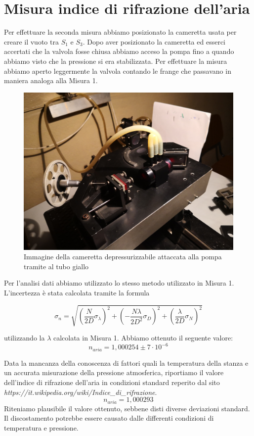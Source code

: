 \documentclass{article}
\begin{document}
\pagebreak
\section{Misura indice di rifrazione dell'aria}
Per effettuare la seconda misura abbiamo posizionato la cameretta usata per creare il vuoto tra $S_1$ e $S_3$. Dopo aver posizionato la cameretta ed esserci accertati che la valvola fosse chiusa abbiamo acceso la pompa fino a quando abbiamo visto che la pressione si era stabilizzata. Per effettuare la misura abbiamo aperto leggermente la valvola contando le frange che passavano in maniera analoga alla Misura 1.

\begin{figure}[h!]
  \centering
  \includegraphics[width=0.6\linewidth]{IM cameretta}
  \caption{Immagine della cameretta depressurizzabile attaccata alla pompa tramite al tubo giallo}
\end{figure}

\pagebreak
Per l'analisi dati abbiamo utilizzato lo stesso metodo utilizzato in Misura 1. L'incertezza è stata calcolata tramite la formula

\begin{equation}
\sigma_n = \sqrt{ (\frac{N}{2D} \sigma_\lambda)^2 + ({-} \frac{N \lambda}{2 D^2} \sigma_D)^2 + (\frac{\lambda}{2D} \sigma_N)^2} 
\end{equation}

utilizzando la $\lambda$ calcolata in Misura 1. Abbiamo ottenuto il seguente valore:
\[ n_{aria} = 1,000254 \pm 7 \cdot 10^{-6} \]

Data la mancanza della conoscenza di fattori quali la temperatura della stanza e un accurata misurazione della pressione atmosferica, riportiamo il valore dell'indice di rifrazione dell'aria in condizioni standard reperito dal sito \textit{https://it.wikipedia.org/wiki/Indice\_di\_rifrazione}.
\[ n_{aria} = 1,000293  \]
Riteniamo plausibile il valore ottenuto, sebbene disti diverse deviazioni standard. Il discostamento potrebbe essere causato dalle differenti condizioni di temperatura e pressione.
\end{document}
